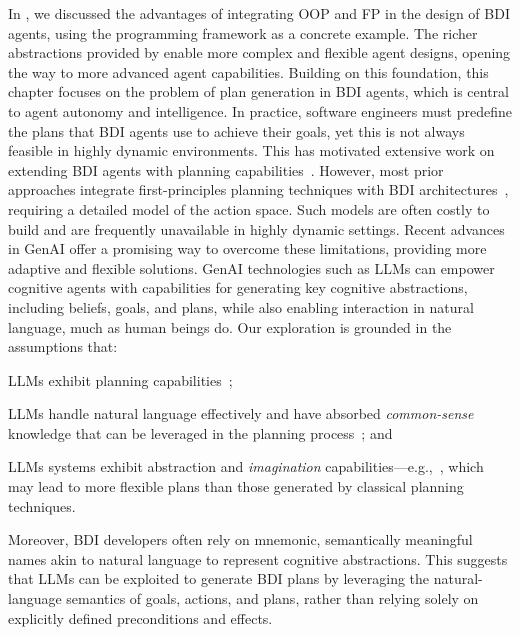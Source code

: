 In , we discussed the advantages of integrating \ac{OOP}
and \ac{FP} in the design of \ac{BDI} agents,
using the \jakta{} programming framework as a concrete example.
%
The richer abstractions provided by \jakta{} enable more complex and flexible agent designs,
opening the way to more advanced agent capabilities.
%
Building on this foundation,
this chapter focuses on the problem of plan generation in \ac{BDI} agents,
which is central to agent autonomy and intelligence.
%
In practice,
software engineers must predefine the plans that \ac{BDI} agents use to achieve their goals,
yet this is not always feasible in highly dynamic environments.
%
This has motivated extensive work on extending \ac{BDI} agents with planning capabilities~\cite{MeneguzziS15}.
%
However,
most prior approaches integrate first-principles planning techniques with \ac{BDI} architectures~\cite{SilvaSP09},
requiring a detailed model of the action space.
%
Such models are often costly to build and are frequently unavailable in highly dynamic settings.
%
Recent advances in \ac{GenAI} offer a promising way to overcome these limitations,
providing more adaptive and flexible solutions.
%
\ac{GenAI} technologies such as \acp{LLM} can empower cognitive agents with capabilities for generating key cognitive abstractions,
including beliefs, goals, and plans,
while also enabling interaction in natural language,
much as human beings do.
%
Our exploration is grounded in the assumptions that:
%
\begin{inlinelist}
    \item \acp{LLM} exhibit planning capabilities~\cite{HuangLWCWL24};
    \item \acp{LLM} handle natural language effectively and have absorbed \emph{common-sense} knowledge that can be leveraged in the planning process~\cite{llmoracles-kbs310}; and
    \item \acp{LLM} systems exhibit abstraction and \emph{imagination} capabilities---e.g.,~\cite{AregbedeAPLL24},
    which may lead to more flexible plans than those generated by classical planning techniques.
\end{inlinelist}
%
Moreover,
\ac{BDI} developers often rely on mnemonic, semantically meaningful names akin to natural language
to represent cognitive abstractions.
This suggests that \acp{LLM} can be exploited to generate \ac{BDI} plans
by leveraging the natural-language semantics of goals, actions, and plans,
rather than relying solely on explicitly defined preconditions and effects.

